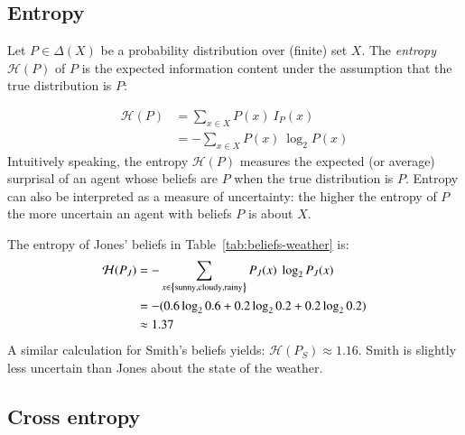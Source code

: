 \documentclass[nobib,nofonts]{tufte-handout}
\begin{document}
\subsection{Entropy}

Let $P\in \Delta(X)$ be a probability distribution over (finite) set $X$.
The \emph{entropy} $\mathcal{H}(P)$ of $P$ is the expected information content under the assumption that the true distribution is $P$:

\begin{align*}
  \mathcal{H}(P) & = \sum_{x \in X} P(x) \ I_{P}(x) \\
                 & = - \sum_{x \in X} P(x) \ \log_{2} P(x)
\end{align*}
Intuitively speaking, the entropy $\mathcal{H}(P)$ measures the expected (or average) surprisal of an agent whose beliefs are $P$ when the true distribution is $P$.
Entropy can also be interpreted as a measure of uncertainty: the higher the entropy of $P$ the more uncertain an agent with beliefs $P$ is about $X$.


\begin{example}
  The entropy of Jones' beliefs in Table~\ref{tab:beliefs-weather} is:
  \begin{align*}
    \mathcal{H}(P_{J})
 & = - \sum_{x \in \left\{\text{sunny}, \text{cloudy}, \text{rainy}\right\}} P_{J}(x) \ \log_{2} P_{J}(x) \\
 & = - (0.6  \log_{2} 0.6
   +  0.2  \log_{2} 0.2
   +  0.2  \log_{2} 0.2) \\
 & \approx 1.37
  \end{align*}
  A similar calculation for Smith's beliefs yields: $\mathcal{H}(P_{S}) \approx 1.16$.
  Smith is slightly less uncertain than Jones about the state of the weather.
\end{example}

\subsection{Cross entropy}
\end{document}
